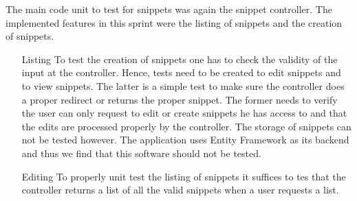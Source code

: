 \documentclass[10pt,a4paper,BCOR12mm, headexclude, footexclude,
  twoside, openright]{scrartcl}
\numberwithin{equation}{section} %
\numberwithin{figure}{section} %
\numberwithin{table}{section} %
\begin{document}
The main code unit to test for snippets was again the snippet controller. The
implemented features in this sprint were the listing of snippets and the
creation of snippets.
\begin{itemize}
\item[Listing] To test the creation of snippets one has to check the validity of the
  input at the controller. Hence, tests need to be created to edit snippets and
  to view snippets. The latter is a simple test to make sure the controller does
  a proper redirect or returns the proper snippet. The former needs to verify
  the user can only request to edit or create snippets he has access to and that
  the edits are processed properly by the controller. The storage of snippets
  can not be tested however. The application uses Entity Framework as its
  backend and thus we find that this software should not be tested.
\item[Editing] To properly unit test the listing of snippets it suffices to tes
  that the controller returns a list of all the valid snippets when a user
  requests a list.
\end{itemize}
\end{document}
